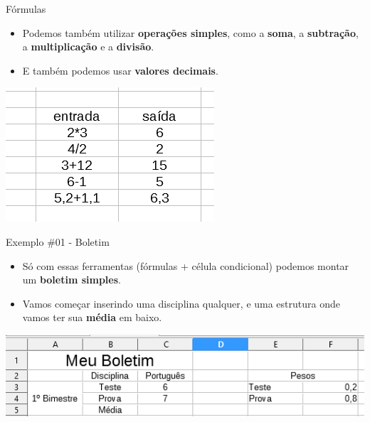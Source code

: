 \begin{frame}{Fórmulas}
	\begin{block}{}
		\begin{itemize}
			\item Podemos também utilizar \textbf{operações simples}, como a \textbf{soma}, a \textbf{subtração}, a \textbf{multiplicação} e a \textbf{divisão}.
			\item E também podemos usar \textbf{valores decimais}.
		\end{itemize}
	\end{block}
	
	\centering
	\includegraphics[width=0.6\linewidth]{Figuras/Ch06/fig44}
\end{frame}


\begin{frame}{Exemplo \#01 - Boletim}
	\begin{block}{}
		\begin{itemize}
			\item Só com essas ferramentas (fórmulas + célula condicional) podemos montar um \textbf{boletim simples}.
			\item Vamos começar inserindo uma disciplina qualquer, e uma estrutura onde vamos ter sua \textbf{média} em baixo.
		\end{itemize}
	\end{block}
	
	\bigskip
	
	\centering
	\includegraphics[width=1\linewidth]{Figuras/Ch06/fig44.1}
\end{frame}


